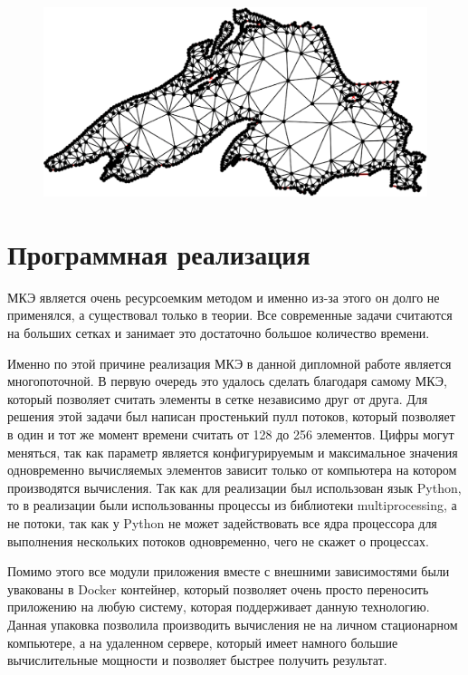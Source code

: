 \documentclass[14pt]{extreport}
\begin{document}
\begin{figure}[H]
\centerline{
\includegraphics[width=1.0\linewidth]{images/ex4/mesh}}
\caption{}
\label{img:ex4:mesh}
\end{figure}

\section{Программная реализация}

МКЭ является очень ресурсоемким методом и именно из-за этого он долго не применялся, а существовал только в теории. Все современные задачи считаются на больших сетках и занимает это достаточно большое количество времени.

Именно по этой причине реализация МКЭ в данной дипломной работе является многопоточной. В первую очередь это удалось сделать благодаря самому МКЭ, который позволяет считать элементы в сетке независимо друг от друга. Для решения этой задачи был написан простенький пулл потоков, который позволяет в один и тот же момент времени считать от 128 до 256 элементов. Цифры могут меняться, так как параметр является конфигурируемым и максимальное значения одновременно вычисляемых элементов зависит только от компьютера на котором производятся вычисления. Так как для реализации был использован язык Python, то в реализации были использованны процессы из библиотеки multiprocessing, а не потоки, так как у Python не может задействовать все ядра процессора для выполнения нескольких потоков одновременно, чего не скажет о процессах.

Помимо этого все модули приложения вместе с внешними зависимостями были увакованы в Docker контейнер, который позволяет очень просто переносить приложению на любую систему, которая поддерживает данную технологию. Данная упаковка позволила производить вычисления не на личном стационарном компьютере, а на удаленном сервере, который имеет намного большие вычислительные мощности и позволяет быстрее получить результат.
\end{document}
